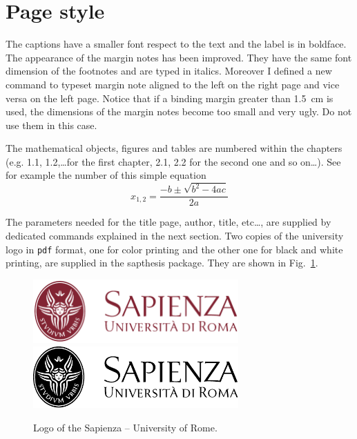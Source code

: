 \documentclass[Lau,binding=0.6cm]{sapthesis}
\begin{document}
\section{Page style}

The captions have a smaller font respect to the text and the label is in boldface. The appearance of the margin notes has been improved.
They have the same font dimension of the footnotes and are typed in italics.
Moreover I defined a new command to typeset margin note aligned to the left on the right page and vice versa on the left page.
Notice that if a binding margin greater than 1.5\, cm is used, the dimensions of the margin notes become too small and very ugly.
Do not use them in this case.

The mathematical objects, figures and tables are numbered within the chapters (e.g. 1.1, 1.2,\ldots for the first chapter, 2.1, 2.2 for the second one and so on\ldots). See for example the number of this simple equation
\begin{equation}
x_{1,2}=\frac{-b\pm\sqrt{b^2-4ac}}{2a}
\end{equation}



The parameters needed for the title page, author, title, etc\ldots , are supplied by dedicated commands explained in the next section.
Two copies of the university logo in \texttt{pdf} format, one for color printing and the other one for black and white printing, are supplied in the \textsf{sapthesis} package. They are shown in Fig.~\ref{fig:largenenough}.

\begin{figure}
\centering
\includegraphics[width=0.7\textwidth]{sapienza-MLred-pos}\\[3ex]
\includegraphics[width=0.7\textwidth]{sapienza-MLblack-pos}
\caption{Logo of the Sapienza -- University of Rome.}
\label{fig:largenenough}
\end{figure}
\end{document}
